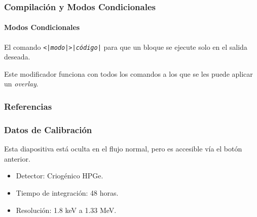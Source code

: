 \documentclass[12pt,aspectratio=169,ignorenonframetext]{ltxbeamer}
\begin{document}





\begin{frame}
\frametitle{Compilación y Modos Condicionales}
\framesubtitle{Modos Condicionales}


El comando \texttt{\mode<|\textit{modo}|>{|\textit{código}|}} para que un bloque se ejecute solo en el salida deseada.

Este modificador funciona con todos los comandos a los que se les puede aplicar un \emph{overlay}.
\end{frame}





\begin{frame}[allowframebreaks]
\frametitle{Referencias}
\nocite{*}
\printbibliography
\end{frame}


\begin{frame}[label=backup0]
    \frametitle{Datos de Calibración}
    Esta diapositiva está oculta en el flujo normal, pero es accesible vía el botón anterior.
    \begin{itemize}
        \item Detector: Criogénico HPGe.
        \item Tiempo de integración: 48 horas.
        \item Resolución: 1.8 keV a 1.33 MeV.
    \end{itemize}
    \vfill\hfill
    \hyperlink{backup0_return}{}
\end{frame}
\end{document}
